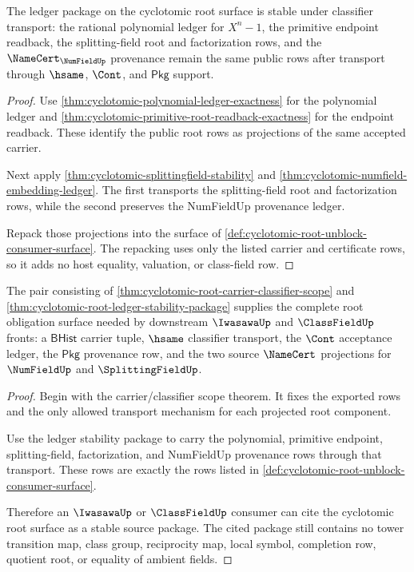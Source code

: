 \begin{theorem}
\label{thm:cyclotomic-root-ledger-stability-package}
The ledger package on the cyclotomic root surface is stable under classifier
transport: the rational polynomial ledger for $X^n-1$, the primitive endpoint
readback, the splitting-field root and factorization rows, and the
$\NameCert_{\NumFieldUp}$ provenance remain the same public rows after
transport through $\hsame$, $\Cont$, and $\mathsf{Pkg}$ support.
\end{theorem}
\begin{proof}
Use \autoref{thm:cyclotomic-polynomial-ledger-exactness} for the polynomial
ledger and \autoref{thm:cyclotomic-primitive-root-readback-exactness} for the
endpoint readback.  These identify the public root rows as projections of the
same accepted carrier.

Next apply \autoref{thm:cyclotomic-splittingfield-stability} and
\autoref{thm:cyclotomic-numfield-embedding-ledger}.  The first transports the
splitting-field root and factorization rows, while the second preserves the
NumFieldUp provenance ledger.

Repack those projections into the surface of
\autoref{def:cyclotomic-root-unblock-consumer-surface}.  The repacking uses
only the listed carrier and certificate rows, so it adds no host equality,
valuation, or class-field row.
\end{proof}

\begin{theorem}
\label{thm:cyclotomic-root-downstream-unblock-package}
The pair consisting of \autoref{thm:cyclotomic-root-carrier-classifier-scope}
and \autoref{thm:cyclotomic-root-ledger-stability-package} supplies the complete
root obligation surface needed by downstream $\IwasawaUp$ and $\ClassFieldUp$
fronts: a $\mathsf{BHist}$ carrier tuple, $\hsame$ classifier transport, the
$\Cont$ acceptance ledger, the $\mathsf{Pkg}$ provenance row, and the two source
$\NameCert$ projections for $\NumFieldUp$ and $\SplittingFieldUp$.
\end{theorem}
\begin{proof}
Begin with the carrier/classifier scope theorem.  It fixes the exported rows
and the only allowed transport mechanism for each projected root component.

Use the ledger stability package to carry the polynomial, primitive endpoint,
splitting-field, factorization, and NumFieldUp provenance rows through that
transport.  These rows are exactly the rows listed in
\autoref{def:cyclotomic-root-unblock-consumer-surface}.

Therefore an $\IwasawaUp$ or $\ClassFieldUp$ consumer can cite the cyclotomic
root surface as a stable source package.  The cited package still contains no
tower transition map, class group, reciprocity map, local symbol, completion
row, quotient root, or equality of ambient fields.
\end{proof}

